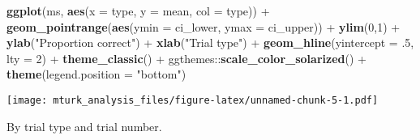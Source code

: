 \documentclass[]{article}
\newenvironment{Shaded}{\begin{snugshade}}{\end{snugshade}}
\newcommand{\KeywordTok}[1]{\textcolor[rgb]{0.13,0.29,0.53}{\textbf{{#1}}}}
\newcommand{\DataTypeTok}[1]{\textcolor[rgb]{0.13,0.29,0.53}{{#1}}}
\newcommand{\DecValTok}[1]{\textcolor[rgb]{0.00,0.00,0.81}{{#1}}}
\newcommand{\StringTok}[1]{\textcolor[rgb]{0.31,0.60,0.02}{{#1}}}
\newcommand{\NormalTok}[1]{{#1}}
\begin{document}
\begin{Shaded}
\begin{Highlighting}[]
\KeywordTok{ggplot}\NormalTok{(ms, }
       \KeywordTok{aes}\NormalTok{(}\DataTypeTok{x =} \NormalTok{type, }\DataTypeTok{y =} \NormalTok{mean, }\DataTypeTok{col =} \NormalTok{type)) +}\StringTok{ }
\StringTok{  }\KeywordTok{geom_pointrange}\NormalTok{(}\KeywordTok{aes}\NormalTok{(}\DataTypeTok{ymin =} \NormalTok{ci_lower, }\DataTypeTok{ymax =} \NormalTok{ci_upper)) +}\StringTok{ }
\StringTok{  }\KeywordTok{ylim}\NormalTok{(}\DecValTok{0}\NormalTok{,}\DecValTok{1}\NormalTok{) +}\StringTok{ }
\StringTok{  }\KeywordTok{ylab}\NormalTok{(}\StringTok{"Proportion correct"}\NormalTok{) +}\StringTok{ }
\StringTok{  }\KeywordTok{xlab}\NormalTok{(}\StringTok{"Trial type"}\NormalTok{) +}\StringTok{ }
\StringTok{  }\KeywordTok{geom_hline}\NormalTok{(}\DataTypeTok{yintercept =} \NormalTok{.}\DecValTok{5}\NormalTok{, }\DataTypeTok{lty =} \DecValTok{2}\NormalTok{)  +}
\StringTok{  }\KeywordTok{theme_classic}\NormalTok{() +}\StringTok{ }
\StringTok{  }\NormalTok{ggthemes::}\KeywordTok{scale_color_solarized}\NormalTok{() +}\StringTok{ }
\StringTok{  }\KeywordTok{theme}\NormalTok{(}\DataTypeTok{legend.position =} \StringTok{"bottom"}\NormalTok{)}
\end{Highlighting}
\end{Shaded}

\texttt{[image: mturk\_analysis\_files/figure-latex/unnamed-chunk-5-1.pdf]}

By trial type and trial number.
\end{document}
